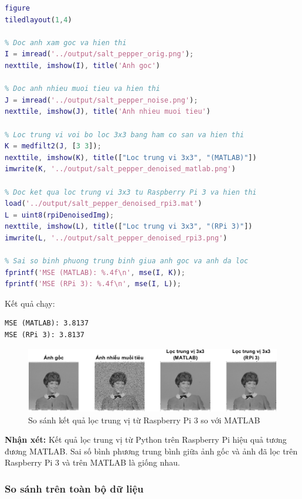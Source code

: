 \begin{lstlisting}[language=MATLAB]
figure
tiledlayout(1,4)

% Doc anh xam goc va hien thi
I = imread('../output/salt_pepper_orig.png');
nexttile, imshow(I), title('Anh goc')

% Doc anh nhieu muoi tieu va hien thi
J = imread('../output/salt_pepper_noise.png');
nexttile, imshow(J), title('Anh nhieu muoi tieu')

% Loc trung vi voi bo loc 3x3 bang ham co san va hien thi
K = medfilt2(J, [3 3]);
nexttile, imshow(K), title(["Loc trung vi 3x3", "(MATLAB)"])
imwrite(K, '../output/salt_pepper_denoised_matlab.png')

% Doc ket qua loc trung vi 3x3 tu Raspberry Pi 3 va hien thi
load('../output/salt_pepper_denoised_rpi3.mat')
L = uint8(rpiDenoisedImg);
nexttile, imshow(L), title(["Loc trung vi 3x3", "(RPi 3)"])
imwrite(L, '../output/salt_pepper_denoised_rpi3.png')

% Sai so binh phuong trung binh giua anh goc va anh da loc
fprintf('MSE (MATLAB): %.4f\n', mse(I, K));
fprintf('MSE (RPi 3): %.4f\n', mse(I, L));
\end{lstlisting}

Kết quả chạy:

\begin{lstlisting}[style=output]
MSE (MATLAB): 3.8137
MSE (RPi 3): 3.8137
\end{lstlisting}

\begin{figure}[H]
    \centering
    \includegraphics[width=1\linewidth]{../images/salt_peper_compare.png}
    \caption{So sánh kết quả lọc trung vị từ Raspberry Pi 3 so với MATLAB}
\end{figure}

\textbf{Nhận xét:} Kết quả lọc trung vị từ Python trên Raspberry Pi hiệu quả tương đương MATLAB. 
Sai số bình phương trung bình giữa ảnh gốc và ảnh đã lọc trên Raspberry Pi 3 và trên MATLAB là giống nhau.

\subsubsection{So sánh trên toàn bộ dữ liệu}

